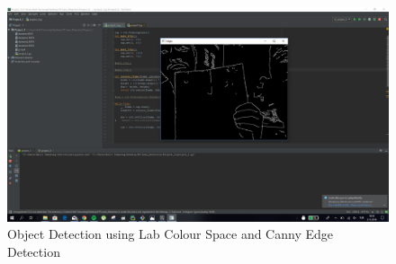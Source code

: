 \documentclass[a4paper,12pt]{article}
\begin{document}
\begin{appendices}
\begin{figure}[H]
\center
\setlength{\unitlength}{\textwidth} 
\includegraphics[width=0.9\unitlength]{9}
\caption{\label{fig:logo} Object Detection using Lab Colour Space and Canny Edge Detection   }
\end{figure}


\end{appendices}
\end{document}
